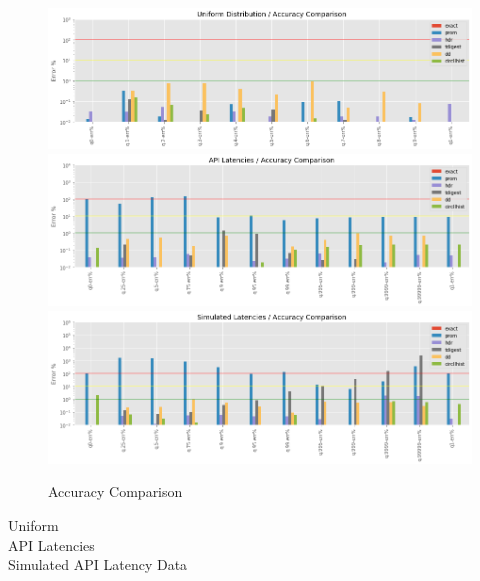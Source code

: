 \documentclass{article}
\theoremstyle{plain}
\theoremstyle{remark}
\begin{document}
\begin{figure}
  \includegraphics[width=\textwidth]{evaluation/images/Uniform_Distribution_accuracy.png}
  \includegraphics[width=\textwidth]{evaluation/images/API_Latencies_accuracy.png}
  \includegraphics[width=\textwidth]{evaluation/images/Simulated_Latencies_accuracy.png}
  \caption{Accuracy Comparison}
\end{figure}


Uniform\\


API Latencies\\


Simulated API Latency Data\\

\end{document}
